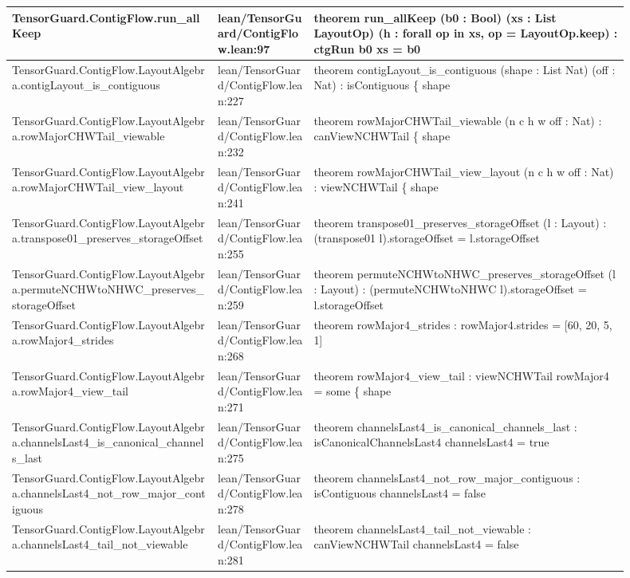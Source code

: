\documentclass[10pt]{article}
\begin{document}
\begin{longtable}{|p{0.30\linewidth}|p{0.14\linewidth}|p{0.46\linewidth}|}
\hline
TensorGuard.ContigFlow.run\_allKeep & lean/TensorGuard/ContigFlow.lean:97 & theorem run\_allKeep (b0 : Bool) (xs : List LayoutOp) (h : forall op in xs, op = LayoutOp.keep) : ctgRun b0 xs = b0 \\
\hline
TensorGuard.ContigFlow.LayoutAlgebra.contigLayout\_is\_contiguous & lean/TensorGuard/ContigFlow.lean:227 & theorem contigLayout\_is\_contiguous (shape : List Nat) (off : Nat) : isContiguous \{ shape \\
\hline
TensorGuard.ContigFlow.LayoutAlgebra.rowMajorCHWTail\_viewable & lean/TensorGuard/ContigFlow.lean:232 & theorem rowMajorCHWTail\_viewable (n c h w off : Nat) : canViewNCHWTail \{ shape \\
\hline
TensorGuard.ContigFlow.LayoutAlgebra.rowMajorCHWTail\_view\_layout & lean/TensorGuard/ContigFlow.lean:241 & theorem rowMajorCHWTail\_view\_layout (n c h w off : Nat) : viewNCHWTail \{ shape \\
\hline
TensorGuard.ContigFlow.LayoutAlgebra.transpose01\_preserves\_storageOffset & lean/TensorGuard/ContigFlow.lean:255 & theorem transpose01\_preserves\_storageOffset (l : Layout) : (transpose01 l).storageOffset = l.storageOffset \\
\hline
TensorGuard.ContigFlow.LayoutAlgebra.permuteNCHWtoNHWC\_preserves\_storageOffset & lean/TensorGuard/ContigFlow.lean:259 & theorem permuteNCHWtoNHWC\_preserves\_storageOffset (l : Layout) : (permuteNCHWtoNHWC l).storageOffset = l.storageOffset \\
\hline
TensorGuard.ContigFlow.LayoutAlgebra.rowMajor4\_strides & lean/TensorGuard/ContigFlow.lean:268 & theorem rowMajor4\_strides : rowMajor4.strides = [60, 20, 5, 1] \\
\hline
TensorGuard.ContigFlow.LayoutAlgebra.rowMajor4\_view\_tail & lean/TensorGuard/ContigFlow.lean:271 & theorem rowMajor4\_view\_tail : viewNCHWTail rowMajor4 = some \{ shape \\
\hline
TensorGuard.ContigFlow.LayoutAlgebra.channelsLast4\_is\_canonical\_channels\_last & lean/TensorGuard/ContigFlow.lean:275 & theorem channelsLast4\_is\_canonical\_channels\_last : isCanonicalChannelsLast4 channelsLast4 = true \\
\hline
TensorGuard.ContigFlow.LayoutAlgebra.channelsLast4\_not\_row\_major\_contiguous & lean/TensorGuard/ContigFlow.lean:278 & theorem channelsLast4\_not\_row\_major\_contiguous : isContiguous channelsLast4 = false \\
\hline
TensorGuard.ContigFlow.LayoutAlgebra.channelsLast4\_tail\_not\_viewable & lean/TensorGuard/ContigFlow.lean:281 & theorem channelsLast4\_tail\_not\_viewable : canViewNCHWTail channelsLast4 = false \\

\end{longtable}
\end{document}
